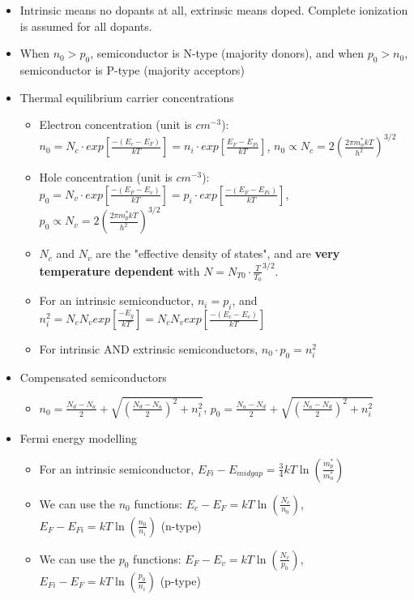 \documentclass{article}
\begin{document}
\begin{itemize}
    \item Intrinsic means no dopants at all, extrinsic means doped. Complete ionization is assumed for all dopants.
    \item When $n_0 > p_0$, semiconductor is N-type (majority donors), and when $p_0 > n_0$, semiconductor is P-type (majority acceptors)
    \item Thermal equilibrium carrier concentrations
    \begin{itemize}
        \item Electron concentration (unit is $cm^{-3}$): $n_0 = N_c \cdot exp\left[\frac{-(E_c - E_F)}{kT}\right] = n_i \cdot exp\left[\frac{E_F - E_{Fi}}{kT}\right]$, $n_0 \propto N_c = 2\left(\frac{2 \pi m_n^* kT}{h^2}\right)^{3/2}$
        \item Hole concentration (unit is $cm^{-3}$): $p_0 = N_v \cdot exp\left[\frac{-(E_F - E_v)}{kT}\right] = p_i \cdot exp\left[\frac{-(E_F - E_{Fi})}{kT}\right]$, $p_0 \propto N_v = 2\left(\frac{2 \pi m_p^* kT}{h^2}\right)^{3/2}$
        \item $N_c$ and $N_v$ are the "effective density of states", and are \textbf{very temperature dependent} with $N = N_{T0} \cdot \frac{T}{T_0}^{3/2}$.
        \item For an intrinsic semiconductor, $n_i = p_i$, and $n_i^2 = N_c N_v exp\left[\frac{-E_g}{kT}\right] = N_c N_v exp\left[\frac{-(E_c - E_v)}{kT}\right]$
        \item For intrinsic AND extrinsic semiconductors, $n_0 \cdot p_0 = n_i^2$
    \end{itemize}
    \item Compensated semiconductors
    \begin{itemize}
        \item $n_0 = \frac{N_d - N_a}{2} + \sqrt{\left(\frac{N_d - N_a}{2}\right)^2 + n_i^2}$, $p_0 = \frac{N_a - N_d}{2} + \sqrt{\left(\frac{N_a - N_d}{2}\right)^2 + n_i^2}$
    \end{itemize}
    \item Fermi energy modelling
    \begin{itemize}
        \item For an intrinsic semiconductor, $E_{Fi} - E_{midgap} = \frac{3}{4} kT \ln \left(\frac{m_p^*}{m_n^*}\right)$
        \item We can use the $n_0$ functions: $E_c - E_F = kT \ln \left(\frac{N_c}{n_0}\right)$, $E_F - E_{Fi} = kT \ln \left(\frac{n_0}{n_i}\right)$ (n-type)
        \item We can use the $p_0$ functions: $E_F - E_v = kT \ln \left(\frac{N_v}{p_0}\right)$, $E_{Fi} - E_F = kT \ln \left(\frac{p_0}{n_i}\right)$ (p-type)
    \end{itemize}
\end{itemize}
\end{document}
